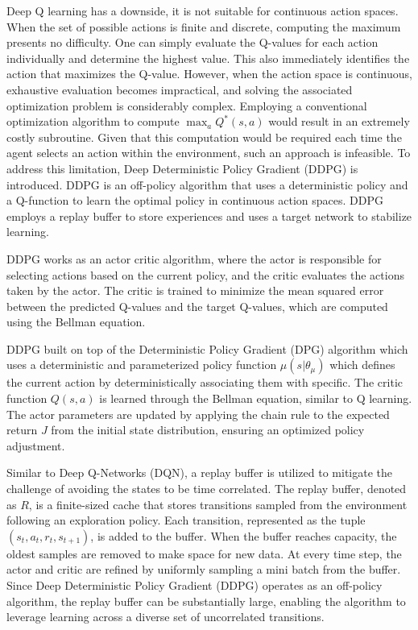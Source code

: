 Deep Q learning has a downside, it is not suitable for continuous action spaces. When the set of possible actions is finite and discrete, computing the maximum presents no difficulty. One can simply evaluate the Q-values for each action individually and determine the highest value. This also immediately identifies the action that maximizes the Q-value. However, when the action space is continuous, exhaustive evaluation becomes impractical, and solving the associated optimization problem is considerably complex. Employing a conventional optimization algorithm to compute $\max_a Q^*(s,a)$ would result in an extremely costly subroutine. Given that this computation would be required each time the agent selects an action within the environment, such an approach is infeasible. To address this limitation, Deep Deterministic Policy Gradient (DDPG) is introduced. DDPG is an off-policy algorithm that uses a deterministic policy and a Q-function to learn the optimal policy in continuous action spaces. DDPG employs a replay buffer to store experiences and uses a target network to stabilize learning.

DDPG works as an actor critic algorithm, where the actor is responsible for selecting actions based on the current policy, and the critic evaluates the actions taken by the actor. The critic is trained to minimize the mean squared error between the predicted Q-values and the target Q-values, which are computed using the Bellman equation.

DDPG built on top of the Deterministic Policy Gradient \cite{deterministic_policy_gradient} (DPG) algorithm which uses a deterministic and parameterized policy function $\mu(s\vert\theta_\mu)$ which defines the current action by deterministically associating them with specific. The critic function $Q(s,a)$ is learned through the Bellman equation, similar to Q learning. The actor parameters are updated by applying the chain rule to the expected return $J$ from the initial state distribution, ensuring an optimized policy adjustment.

Similar to Deep Q-Networks (DQN), a replay buffer is utilized to mitigate the challenge of avoiding the states to be time correlated. The replay buffer, denoted as $R$, is a finite-sized cache that stores transitions sampled from the environment following an exploration policy. Each transition, represented as the tuple $(s_t, a_t, r_t, s_{t+1})$, is added to the buffer. When the buffer reaches capacity, the oldest samples are removed to make space for new data. At every time step, the actor and critic are refined by uniformly sampling a mini batch from the buffer. Since Deep Deterministic Policy Gradient (DDPG) operates as an off-policy algorithm, the replay buffer can be substantially large, enabling the algorithm to leverage learning across a diverse set of uncorrelated transitions.

